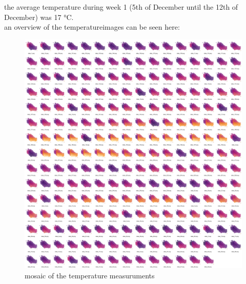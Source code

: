 \FloatBarrier 
the average temperature during week 1 (5th of December until the 12th of December) was 17 °C. \\an overview of the temperatureimages can be seen here:\begin{figure}[hbt!] 
\centering 
\includegraphics[width=\textwidth]{reports/current_report/images/montage_temperature.jpg}  
\caption{mosaic of the temperature measuruments} 
\end{figure} 
\FloatBarrier 
